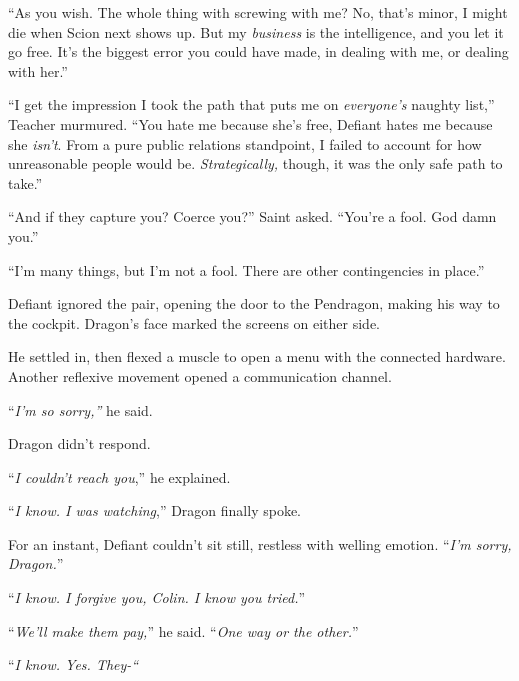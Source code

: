 ``As you wish.  The whole thing with screwing with me?  No, that's minor, I might die when Scion next shows up.  But my \emph{business} is the intelligence, and you let it go free.  It's the biggest error you could have made, in dealing with me, or dealing with her.''



``I get the impression I took the path that puts me on \emph{everyone's }naughty list,'' Teacher murmured.  ``You hate me because she's free, Defiant hates me because she \emph{isn't}.  From a pure public relations standpoint, I failed to account for how unreasonable people would be.  \emph{Strategically,} though, it was the only safe path to take.''



``And if they capture you?  Coerce you?'' Saint asked.  ``You're a fool.  God damn you.''



``I'm many things, but I'm not a fool.  There are other contingencies in place.''



Defiant ignored the pair, opening the door to the Pendragon, making his way to the cockpit.  Dragon's face marked the screens on either side.



He settled in, then flexed a muscle to open a menu with the connected hardware.  Another reflexive movement opened a communication channel.



``\emph{I'm so sorry,''} he said.



Dragon didn't respond.



``\emph{I couldn't reach you},'' he explained.



``\emph{I know.  I was watching},'' Dragon finally spoke.



For an instant, Defiant couldn't sit still, restless with welling emotion.  ``\emph{I'm sorry, Dragon.}''



``\emph{I know.  I forgive you, Colin.  I know you tried.}''



``\emph{We'll make them pay,}'' he said.  ``\emph{One way or the other.}''



``\emph{I know.  Yes.  They-``}



